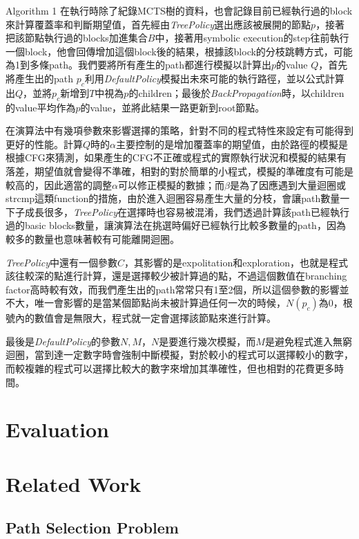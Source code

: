 \documentclass[12pt,a4paper,oneside]{book}
\begin{document}
Algorithm 1 在執行時除了紀錄MCTS樹的資料，也會記錄目前已經執行過的block來計算覆蓋率和判斷期望值，首先經由\textit{TreePolicy}選出應該被展開的節點$p$，接著把該節點執行過的blocks加進集合$B$中，接著用symbolic execution的step往前執行一個block，他會回傳增加這個block後的結果，根據該block的分枝跳轉方式，可能為1到多條path。我們要將所有產生的path都進行模擬以計算出$p$的value $Q$，首先將產生出的path $p_c$利用\textit{DefaultPolicy}模擬出未來可能的執行路徑，並以公式計算出$Q$，並將$p_c$新增到$T$中視為$p$的children；最後於\textit{BackPropagation}時，以children的value平均作為$p$的value，並將此結果一路更新到root節點。
  
在演算法中有幾項參數來影響選擇的策略，針對不同的程式特性來設定有可能得到更好的性能。計算$Q$時的$\alpha$主要控制的是增加覆蓋率的期望值，由於路徑的模擬是根據CFG來猜測，如果產生的CFG不正確或程式的實際執行狀況和模擬的結果有落差，期望值就會變得不準確，相對的對於簡單的小程式，模擬的準確度有可能是較高的，因此適當的調整$\alpha$可以修正模擬的數據；而$\beta$是為了因應遇到大量迴圈或strcmp這類function的措施，由於進入迴圈容易產生大量的分枝，會讓path數量一下子成長很多，\textit{TreePolicy}在選擇時也容易被混淆，我們透過計算該path已經執行過的basic blocks數量，讓演算法在挑選時偏好已經執行比較多數量的path，因為較多的數量也意味著較有可能離開迴圈。

\textit{TreePolicy}中還有一個參數$C$，其影響的是expolitation和exploration，也就是程式該往較深的點進行計算，還是選擇較少被計算過的點，不過這個數值在branching factor高時較有效，而我們產生出的path常常只有1至2個，所以這個參數的影響並不大，唯一會影響的是當某個節點尚未被計算過任何一次的時候，$N(p_c)$為0，根號內的數值會是無限大，程式就一定會選擇該節點來進行計算。
  
最後是\textit{DefaultPolicy}的參數$N,M$，$N$是要進行幾次模擬，而$M$是避免程式進入無窮迴圈，當到達一定數字時會強制中斷模擬，對於較小的程式可以選擇較小的數字，而較複雜的程式可以選擇比較大的數字來增加其準確性，但也相對的花費更多時間。

\chapter{Evaluation}

\chapter{Related Work}

\section{Path Selection Problem}
\end{document}
